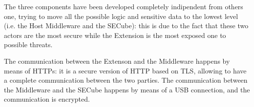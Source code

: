 The three components have been developed completely indipendent from others one, trying to move all the possible logic and sensitive data to the lowest level (i.e. the Host Middleware and the SECube): this is due to the fact that these two actors are the most secure while the Extension is the most exposed one to possible threats. \bigskip

The communication between the Extenson and the Middleware happens by means of HTTPs: it is a secure version of HTTP based on TLS, allowing to have a complete communication between the two parties. The communication between the Middleware and the SECube happens by means of a USB connection, and the communication is encrypted. 

